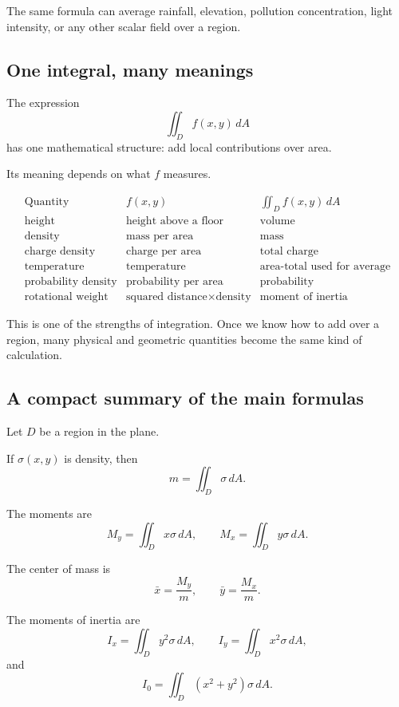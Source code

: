 The same formula can average rainfall, elevation, pollution concentration, light intensity,
or any other scalar field over a region.

\subsection{One integral, many meanings}

The expression
\[
    \iint_D f(x,y)\,dA
\]
has one mathematical structure: add local contributions over area.

Its meaning depends on what \(f\) measures.

\[
\begin{array}{c|c|c}
\text{Quantity} & f(x,y) & \iint_D f(x,y)\,dA \\ \hline
\text{height} & \text{height above a floor} & \text{volume}\\[1mm]
\text{density} & \text{mass per area} & \text{mass}\\[1mm]
\text{charge density} & \text{charge per area} & \text{total charge}\\[1mm]
\text{temperature} & \text{temperature} & \text{area-total used for average}\\[1mm]
\text{probability density} & \text{probability per area} & \text{probability}\\[1mm]
\text{rotational weight} & \text{squared distance}\times\text{density} & \text{moment of inertia}
\end{array}
\]

This is one of the strengths of integration.  Once we know how to add over a region,
many physical and geometric quantities become the same kind of calculation.

\subsection{A compact summary of the main formulas}

Let \(D\) be a region in the plane.

If \(\sigma(x,y)\) is density, then
\[
\boxed{
    m=\iint_D \sigma\,dA.
}
\]

The moments are
\[
\boxed{
    M_y=\iint_D x\sigma\,dA,
    \qquad
    M_x=\iint_D y\sigma\,dA.
}
\]

The center of mass is
\[
\boxed{
    \bar x=\frac{M_y}{m},
    \qquad
    \bar y=\frac{M_x}{m}.
}
\]

The moments of inertia are
\[
\boxed{
    I_x=\iint_D y^2\sigma\,dA,
    \qquad
    I_y=\iint_D x^2\sigma\,dA,
}
\]
and
\[
\boxed{
    I_0=\iint_D (x^2+y^2)\sigma\,dA.
}
\]

